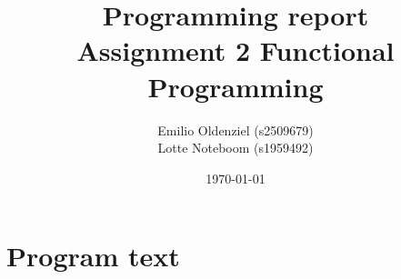 \documentclass[a4paper]{article}
\begin{document}
\title{Programming report\\
       Assignment 2 Functional Programming
}
\date{\today}
\author{Emilio Oldenziel (s2509679)\\  Lotte Noteboom (s1959492)}

\maketitle

\section{Program text}

\end{document}
